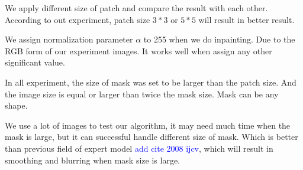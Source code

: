 We apply different size of patch and compare the result with each other. According to out experiment, patch size $3*3$ or $5*5$ will result in better result.

We assign normalization parameter $\alpha$ to 255 when we do inpainting. Due to the RGB form of our experiment images. It works well when assign any other significant value.

In all experiment, the size of mask was set to be larger than the patch size. And the image size is equal or larger than twice the mask size. Mask can be any shape.

We use a lot of images to test our algorithm, it may need much time when the mask is large, but it can successful handle different size of mask. Which is better than previous field of expert model \textcolor{blue}{add cite 2008 ijcv}, which will result in smoothing and blurring when mask size is large.
